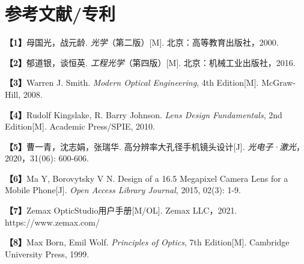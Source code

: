 \section{参考文献/专利}

\textbf{【1】}母国光，战元龄. \emph{光学}（第二版）{[}M{]}. 北京：高等教育出版社，2000.

\textbf{【2】}郁道银，谈恒英. \emph{工程光学}（第四版）{[}M{]}. 北京：机械工业出版社，2016.

\textbf{【3】}Warren J. Smith. \emph{Modern Optical Engineering}, 4th Edition{[}M{]}. McGraw-Hill, 2008.

\textbf{【4】}Rudolf Kingslake, R. Barry Johnson. \emph{Lens Design Fundamentals}, 2nd Edition{[}M{]}. Academic Press/SPIE, 2010.

\textbf{【5】}曹一青，沈志娟，张瑞华. 高分辨率大孔径手机镜头设计{[}J{]}. \emph{光电子·激光}，2020，31(06): 600-606.

\textbf{【6】}Ma Y, Borovytsky V N. Design of a 16.5 Megapixel Camera Lens for a Mobile Phone{[}J{]}. \emph{Open Access Library Journal}, 2015, 02(3): 1-9.

\textbf{【7】}Zemax OpticStudio用户手册{[}M/OL{]}. Zemax LLC，2021. https://www.zemax.com/

\textbf{【8】}Max Born, Emil Wolf. \emph{Principles of Optics}, 7th Edition{[}M{]}. Cambridge University Press, 1999.
